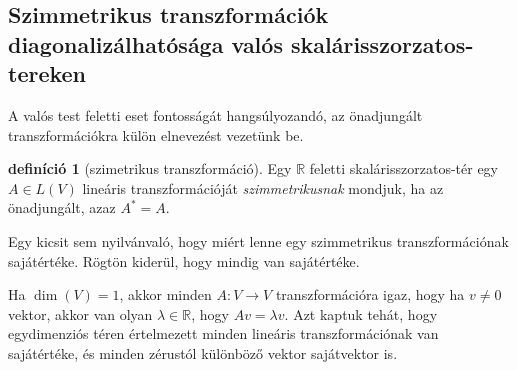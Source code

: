 \documentclass[9pt, a4paper, showtrims]{memoir}
\theoremstyle{plain}
\theoremstyle{remark}
\theoremstyle{definition}
\newtheorem{definition}[proposition]{definíció}
\begin{document}
\subsection{Szimmetrikus transzformációk diagonalizálhatósága valós skalárisszorzatos-tereken}
A valós test feletti eset fontosságát hangsúlyozandó,
az önadjungált transzformációkra külön elnevezést vezetünk be.
\begin{definition}[szimetrikus transzformáció]
	Egy $\mathbb{R}$ feletti skalárisszorzatos-tér egy $A\in L\left( V \right)$ lineáris transzformációját
	\emph{szimmetrikusnak} mondjuk, ha az önadjungált, azaz  $A^\ast=A$.
\end{definition}
Egy kicsit sem nyilvánvaló, hogy miért lenne egy szimmetrikus transzformációnak sajátértéke.
Rögtön kiderül, hogy mindig van sajátértéke.

Ha $\dim(V)=1$, akkor minden $A:V\to V$ transzformációra igaz, hogy ha $v\neq 0$ vektor, 
akkor van olyan $\lambda\in\mathbb{R}$,
hogy $Av=\lambda v$. 
Azt kaptuk tehát, hogy egydimenziós téren értelmezett minden lineáris transzformációnak
van sajátértéke, és minden zérustól különböző vektor sajátvektor is.
\end{document}

